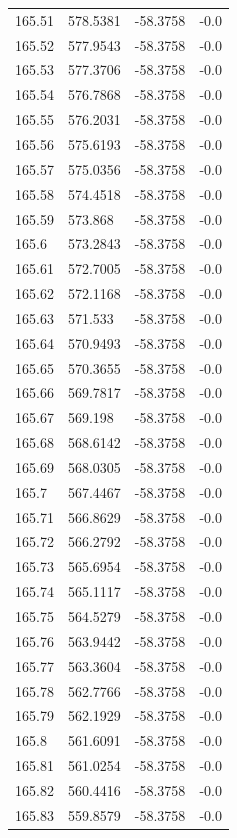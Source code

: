 \begin{table}[H]
\begin{tabular}{llll}
165.51 & 578.5381 & -58.3758 & -0.0 \\
165.52 & 577.9543 & -58.3758 & -0.0 \\
165.53 & 577.3706 & -58.3758 & -0.0 \\
165.54 & 576.7868 & -58.3758 & -0.0 \\
165.55 & 576.2031 & -58.3758 & -0.0 \\
165.56 & 575.6193 & -58.3758 & -0.0 \\
165.57 & 575.0356 & -58.3758 & -0.0 \\
165.58 & 574.4518 & -58.3758 & -0.0 \\
165.59 & 573.868 & -58.3758 & -0.0 \\
165.6 & 573.2843 & -58.3758 & -0.0 \\
165.61 & 572.7005 & -58.3758 & -0.0 \\
165.62 & 572.1168 & -58.3758 & -0.0 \\
165.63 & 571.533 & -58.3758 & -0.0 \\
165.64 & 570.9493 & -58.3758 & -0.0 \\
165.65 & 570.3655 & -58.3758 & -0.0 \\
165.66 & 569.7817 & -58.3758 & -0.0 \\
165.67 & 569.198 & -58.3758 & -0.0 \\
165.68 & 568.6142 & -58.3758 & -0.0 \\
165.69 & 568.0305 & -58.3758 & -0.0 \\
165.7 & 567.4467 & -58.3758 & -0.0 \\
165.71 & 566.8629 & -58.3758 & -0.0 \\
165.72 & 566.2792 & -58.3758 & -0.0 \\
165.73 & 565.6954 & -58.3758 & -0.0 \\
165.74 & 565.1117 & -58.3758 & -0.0 \\
165.75 & 564.5279 & -58.3758 & -0.0 \\
165.76 & 563.9442 & -58.3758 & -0.0 \\
165.77 & 563.3604 & -58.3758 & -0.0 \\
165.78 & 562.7766 & -58.3758 & -0.0 \\
165.79 & 562.1929 & -58.3758 & -0.0 \\
165.8 & 561.6091 & -58.3758 & -0.0 \\
165.81 & 561.0254 & -58.3758 & -0.0 \\
165.82 & 560.4416 & -58.3758 & -0.0 \\
165.83 & 559.8579 & -58.3758 & -0.0 \\

\end{tabular}
\end{table}
